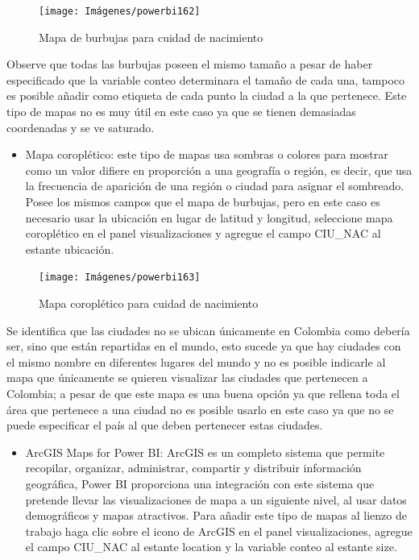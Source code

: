 \documentclass[
]{book}
\providecommand{\tightlist}{%
  \setlength{\itemsep}{0pt}\setlength{\parskip}{0pt}}
\begin{document}
\begin{figure}

{\centering \texttt{[image: Imágenes/powerbi162]} 

}

\caption{Mapa de burbujas para cuidad de nacimiento}\label{fig:mapaburbujas-fig}
\end{figure}

Observe que todas las burbujas poseen el mismo tamaño a pesar de haber especificado que la variable conteo determinara el tamaño de cada una, tampoco es posible añadir como etiqueta de cada punto la ciudad a la que pertenece. Este tipo de mapas no es muy útil en este caso ya que se tienen demasiadas coordenadas y se ve saturado.

\begin{itemize}
\tightlist
\item
  Mapa coroplético: este tipo de mapas usa sombras o colores para mostrar como un valor difiere en proporción a una geografía o región, es decir, que usa la frecuencia de aparición de una región o ciudad para asignar el sombreado. Posee los mismos campos que el mapa de burbujas, pero en este caso es necesario usar la ubicación en lugar de latitud y longitud, seleccione mapa coroplético en el panel visualizaciones y agregue el campo CIU\_NAC al estante ubicación.
\end{itemize}

\begin{figure}

{\centering \texttt{[image: Imágenes/powerbi163]} 

}

\caption{Mapa coroplético para cuidad de nacimiento}\label{fig:maparelleno-fig}
\end{figure}

Se identifica que las ciudades no se ubican únicamente en Colombia como debería ser, sino que están repartidas en el mundo, esto sucede ya que hay ciudades con el mismo nombre en diferentes lugares del mundo y no es posible indicarle al mapa que únicamente se quieren visualizar las ciudades que pertenecen a Colombia; a pesar de que este mapa es una buena opción ya que rellena toda el área que pertenece a una ciudad no es posible usarlo en este caso ya que no se puede especificar el país al que deben pertenecer estas ciudades.

\begin{itemize}
\tightlist
\item
  ArcGIS Maps for Power BI: ArcGIS es un completo sistema que permite recopilar, organizar, administrar, compartir y distribuir información geográfica, Power BI proporciona una integración con este sistema que pretende llevar las visualizaciones de mapa a un siguiente nivel, al usar datos demográficos y mapas atractivos. Para añadir este tipo de mapas al lienzo de trabajo haga clic sobre el icono de ArcGIS en el panel visualizaciones, agregue el campo CIU\_NAC al estante location y la variable conteo al estante size.
\end{itemize}
\end{document}
